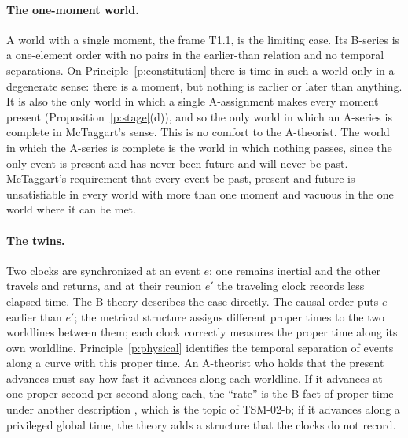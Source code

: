 \documentclass{situationist-preprint}
\begin{document}
\paragraph{The one-moment world.} A world with a single moment, the frame T1.1, is the limiting case. Its B-series is a one-element order with no pairs in the earlier-than relation and no temporal separations. On Principle~\ref{p:constitution} there is time in such a world only in a degenerate sense: there is a moment, but nothing is earlier or later than anything. It is also the only world in which a single A-assignment makes every moment present (Proposition~\ref{p:stage}(d)), and so the only world in which an A-series is complete in McTaggart's sense. This is no comfort to the A-theorist. The world in which the A-series is complete is the world in which nothing passes, since the only event is present and has never been future and will never be past. McTaggart's requirement that every event be past, present and future is unsatisfiable in every world with more than one moment and vacuous in the one world where it can be met.

\paragraph{The twins.} Two clocks are synchronized at an event $e$; one remains inertial and the other travels and returns, and at their reunion $e'$ the traveling clock records less elapsed time. The B-theory describes the case directly. The causal order puts $e$ earlier than $e'$; the metrical structure assigns different proper times to the two worldlines between them; each clock correctly measures the proper time along its own worldline. Principle~\ref{p:physical} identifies the temporal separation of events along a curve with this proper time. An A-theorist who holds that the present advances must say how fast it advances along each worldline. If it advances at one proper second per second along each, the \enquote{rate} is the B-fact of proper time under another description \citep{Markosian1993}, which is the topic of TSM-02-b; if it advances along a privileged global time, the theory adds a structure that the clocks do not record.
\end{document}
